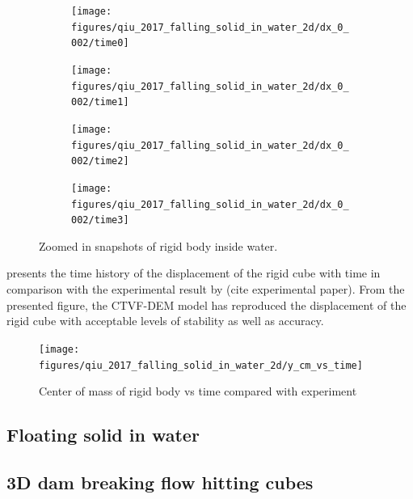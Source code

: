 \documentclass[preprint,12pt]{elsarticle}
\begin{document}
\begin{figure}[!htpb]
  \centering
  \begin{subfigure}{0.48\textwidth}
    \centering
    \texttt{[image: figures/qiu\_2017\_falling\_solid\_in\_water\_2d/dx\_0\_002/time0]}
  \end{subfigure}
  \begin{subfigure}{0.48\textwidth}
    \centering
    \texttt{[image: figures/qiu\_2017\_falling\_solid\_in\_water\_2d/dx\_0\_002/time1]}
  \end{subfigure}

  \begin{subfigure}{0.48\textwidth}
    \centering
    \texttt{[image: figures/qiu\_2017\_falling\_solid\_in\_water\_2d/dx\_0\_002/time2]}
  \end{subfigure}
  \begin{subfigure}{0.48\textwidth}
    \centering
    \texttt{[image: figures/qiu\_2017\_falling\_solid\_in\_water\_2d/dx\_0\_002/time3]}
  \end{subfigure}
  \caption{Zoomed in snapshots of rigid body inside water.}
\label{fig:snapshots-falling-solid-in-water-zoomed}
\end{figure}

 presents the time history of the
displacement of the rigid cube with time in comparison with the experimental
result by (cite experimental paper). From the presented figure, the CTVF-DEM
model has reproduced the displacement of the rigid cube with acceptable levels
of stability as well as accuracy.
\begin{figure}[!htpb]
  \centering
  \texttt{[image: figures/qiu\_2017\_falling\_solid\_in\_water\_2d/y\_cm\_vs\_time]}
  \caption{Center of mass of rigid body vs time compared with experiment}
\label{fig:disp-falling-solid-in-water}
\end{figure}


\FloatBarrier%
\subsection{Floating solid in water}
\label{sec:floating-solid-in-water}


\FloatBarrier%
\subsection{3D dam breaking flow hitting cubes}

\cite{amaro2019improvement}
\end{document}
